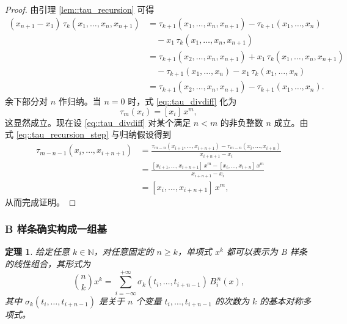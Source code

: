 \documentclass[a4paper]{ctexart}
\newtheorem{theorem}{定理}
\numberwithin{theorem}{section}
\numberwithin{equation}{section}
\numberwithin{figure}{section}
\numberwithin{remark}{section}
\begin{document}
\begin{proof}
由引理 \ref{lem::tau_recursion} 可得
\begin{equation}
\label{eq::tau_recursion_step}
\begin{array}{rl}
(x_{n+1}-x_1)\,\tau_k(x_1,\ldots,x_n,x_{n+1})
&=\tau_{k+1}(x_1,\ldots,x_n,x_{n+1})-\tau_{k+1}(x_1,\ldots,x_n)\nonumber\\
&\quad -x_1\,\tau_k(x_1,\ldots,x_n,x_{n+1})\nonumber\\
&=\tau_{k+1}(x_2,\ldots,x_n,x_{n+1})+x_1\,\tau_k(x_1,\ldots,x_n,x_{n+1})\nonumber\\
&\quad -\tau_{k+1}(x_1,\ldots,x_n)-x_1\,\tau_k(x_1,\ldots,x_n)\nonumber\\
&=\tau_{k+1}(x_2,\ldots,x_n,x_{n+1})-\tau_{k+1}(x_1,\ldots,x_n).
\end{array}
\end{equation}
余下部分对 $n$ 作归纳。当 $n=0$ 时，式 \eqref{eq::tau_divdiff} 化为
\[
\tau_m(x_i)=[x_i]\,x^{m},
\]
这显然成立。现在设 \eqref{eq::tau_divdiff} 对某个满足 $n<m$ 的非负整数 $n$ 成立。由式 \eqref{eq::tau_recursion_step} 与归纳假设得到
\[
\begin{aligned}
\tau_{m-n-1}(x_i,\ldots,x_{i+n+1})
&=\frac{\tau_{m-n}(x_{i+1},\ldots,x_{i+n+1})-\tau_{m-n}(x_i,\ldots,x_{i+n})}{x_{i+n+1}-x_i}\\
&=\frac{[x_{i+1},\ldots,x_{i+n+1}]\,x^{m}-[x_i,\ldots,x_{i+n}]\,x^{m}}{x_{i+n+1}-x_i}\\
&=[x_i,\ldots,x_{i+n+1}]\,x^{m},
\end{aligned}
\]
从而完成证明。
\end{proof}

\subsubsection{B 样条确实构成一组基}

\begin{theorem}
    \label{thm::bspline_basis}
给定任意 $k\in\mathbb{N}$，对任意固定的 $n\ge k$，单项式 $x^{k}$ 都可以表示为 B 样条的线性组合，其形式为
\begin{equation}
\label{eq::monomial_bspline_combo}
\binom{n}{k}x^{k}=\sum_{i=-\infty}^{+\infty}\sigma_k(t_i,\ldots,t_{i+n-1})\,B^{\,n}_i(x),
\end{equation}
其中 $\sigma_k(t_i,\ldots,t_{i+n-1})$ 是关于 $n$ 个变量 $t_i,\ldots,t_{i+n-1}$ 的次数为 $k$ 的基本对称多项式。
\end{theorem}
\end{document}
